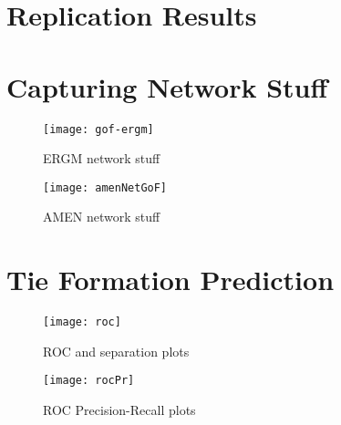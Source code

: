 

\section{Replication Results}



\section{Capturing Network Stuff}

\begin{figure}[ht]
	\centering
	\texttt{[image: gof-ergm]}
	\caption{ERGM network stuff}
	\label{fig:ergmNetGoF}
\end{figure}

\begin{figure}[ht]
	\centering
	\texttt{[image: amenNetGoF]}
	\caption{AMEN network stuff}
	\label{fig:amenNetGoF}
\end{figure}

\section{Tie Formation Prediction}



\begin{figure}[ht]
	\centering
	\texttt{[image: roc]}
	\caption{ROC and separation plots}
	\label{fig:roc}
\end{figure}

\begin{figure}[ht]
	\centering
	\texttt{[image: rocPr]}
	\caption{ROC Precision-Recall plots}
	\label{fig:rocPr}
\end{figure}




